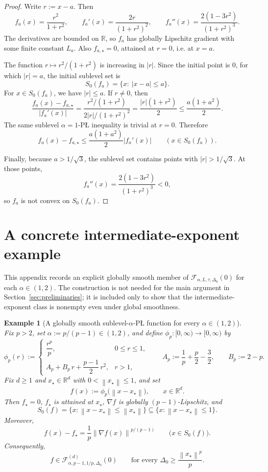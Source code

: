 \documentclass[11pt]{article}
\newtheorem{example}[theorem]{Example}
\newcommand{\R}{\mathbb{R}}
\newcommand{\norm}[1]{\left\lVert #1\right\rVert}
\newcommand{\abs}[1]{\left\lvert #1\right\rvert}
\begin{document}
\begin{proof}
Write \(r:=x-a\). Then
\[
f_a(x)=\frac{r^2}{1+r^2},
\qquad
f_a'(x)=\frac{2r}{(1+r^2)^2},
\qquad
f_a''(x)=\frac{2(1-3r^2)}{(1+r^2)^3}.
\]
The derivatives are bounded on \(\R\), so \(f_a\) has globally Lipschitz gradient with some finite constant \(L_a\).
Also \(f_{a,\star}=0\), attained at \(r=0\), i.e. at \(x=a\).

The function \(r\mapsto r^2/(1+r^2)\) is increasing in \(|r|\). Since the initial point is \(0\), for which
\(|r|=a\), the initial sublevel set is
\[
S_0(f_a)=\{x:\ |x-a|\le a\}.
\]
For \(x\in S_0(f_a)\), we have \(|r|\le a\). If \(r\ne0\), then
\[
\frac{f_a(x)-f_{a,\star}}{\abs{f_a'(x)}}
=
\frac{r^2/(1+r^2)}{2|r|/(1+r^2)^2}
=
\frac{|r|(1+r^2)}{2}
\le
\frac{a(1+a^2)}{2}.
\]
The same sublevel \(\alpha=1\)-P\L{} inequality is trivial at \(r=0\). Therefore
\[
f_a(x)-f_{a,\star}
\le
\frac{a(1+a^2)}{2}\abs{f_a'(x)}
\qquad
(x\in S_0(f_a)).
\]

Finally, because \(a>1/\sqrt3\), the sublevel set contains points with \(|r|>1/\sqrt3\). At those points,
\[
f_a''(x)=\frac{2(1-3r^2)}{(1+r^2)^3}<0,
\]
so \(f_a\) is not convex on \(S_0(f_a)\).
\end{proof}

\section{A concrete intermediate-exponent example}
\label{app:explicit-intermediate}

This appendix records an explicit globally smooth member of
\(\mathcal F_{\alpha,L,\tau,\Delta_0}(0)\) for each \(\alpha\in(1,2)\). The construction is not needed for the main
argument in Section~\ref{sec:preliminaries}; it is included only to show that the intermediate-exponent class is
nonempty even under global smoothness.

\begin{example}[A globally smooth sublevel-\(\alpha\)-P\L{} function for every \(\alpha\in(1,2)\)]
\label{ex:explicit-intermediate}
Fix \(p>2\), set \(\alpha:=p/(p-1)\in(1,2)\), and define \(\phi_p:[0,\infty)\to[0,\infty)\) by
\[
\phi_p(r):=
\begin{cases}
\dfrac{r^p}{p}, & 0\le r\le 1,\\[0.7em]
A_p+B_p\,r+\dfrac{p-1}{2}\,r^2, & r>1,
\end{cases}
\qquad
A_p:=\frac{1}{p}+\frac{p}{2}-\frac{3}{2},
\qquad
B_p:=2-p .
\]
Fix \(d\ge 1\) and \(x_\star\in\R^d\) with \(0<\norm{x_\star}\le 1\), and set
\[
f(x):=\phi_p\bigl(\norm{x-x_\star}\bigr),
\qquad x\in\R^d.
\]
Then \(f_\star=0\), \(f_\star\) is attained at \(x_\star\), \(\nabla f\) is globally \((p-1)\)-Lipschitz, and
\[
S_0(f)=\{x:\norm{x-x_\star}\le \norm{x_\star}\}\subseteq \{x:\norm{x-x_\star}\le 1\}.
\]
Moreover,
\[
f(x)-f_\star
=
\frac1p\norm{\nabla f(x)}^{p/(p-1)}
\qquad
\bigl(x\in S_0(f)\bigr).
\]
Consequently,
\[
f\in \mathcal F^{(d)}_{\alpha,p-1,1/p,\Delta_0}(0)
\qquad
\text{for every }\Delta_0\ge \frac{\norm{x_\star}^p}{p}.
\]
\end{example}
\end{document}
